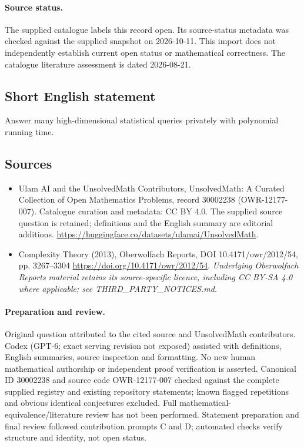 \documentclass[11pt]{article}
\begin{document}
\paragraph{Source status.}
The supplied catalogue labels this record open. Its source-status metadata was checked against the supplied snapshot on 2026-10-11. This import does not independently establish current open status or mathematical correctness. The catalogue literature assessment is dated 2026-08-21.
\subsection{Short English statement}
Answer many high-dimensional statistical queries privately with polynomial running time.
\subsection{Sources}
\begin{itemize}
\item[\hypertarget{source:30002238:1}{S1}] Ulam AI and the UnsolvedMath Contributors, UnsolvedMath: A Curated Collection of Open Mathematics Problems, record 30002238 (OWR-12177-007). Catalogue curation and metadata: CC BY 4.0. The supplied source question is retained; definitions and the English summary are editorial additions.
\url{https://huggingface.co/datasets/ulamai/UnsolvedMath}.
\item[\hypertarget{source:30002238:2}{S2}] Complexity Theory (2013), Oberwolfach Reports, DOI 10.4171/owr/2012/54, pp. 3267--3304
\url{https://doi.org/10.4171/owr/2012/54}.
\textit{Underlying Oberwolfach Reports material retains its source-specific licence, including CC BY-SA 4.0 where applicable; see THIRD\_PARTY\_NOTICES.md.}
\end{itemize}
\paragraph{Preparation and review.}
Original question attributed to the cited source and UnsolvedMath contributors. Codex (GPT-6; exact serving revision not exposed) assisted with definitions, English summaries, source inspection and formatting. No new human mathematical authorship or independent proof verification is asserted. Canonical ID 30002238 and source code OWR-12177-007 checked against the complete supplied registry and existing repository statements; known flagged repetitions and obvious identical conjectures excluded. Full mathematical-equivalence/literature review has not been performed. Statement preparation and final review followed contribution prompts C and D; automated checks verify structure and identity, not open status.
\label{end:30002238}
\end{document}
